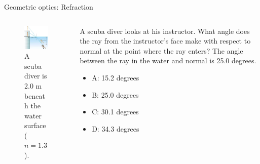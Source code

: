\documentclass{beamer}
\begin{document}
\begin{frame}{Geometric optics: Refraction}
\begin{columns}[T]
\begin{column}{0.5\textwidth}
\begin{figure}
\centering
\includegraphics[width=0.95\textwidth]{figures/scuba.png}
\caption{\label{fig:scuba2} \footnotesize A scuba diver is 2.0 m beneath the water surface ($n=1.3$).}
\end{figure}
\end{column}
\begin{column}{0.5\textwidth}
\footnotesize
A scuba diver looks at his instructor.  What angle does the ray from the instructor’s face make with respect to normal at the point where the ray enters? The angle between the ray in the water and normal is 25.0 degrees.
\begin{itemize}
\item A: 15.2 degrees
\item B: 25.0 degrees
\item C: 30.1 degrees
\item D: 34.3 degrees
\end{itemize}
\end{column}
\end{columns}
\end{frame}
\end{document}
